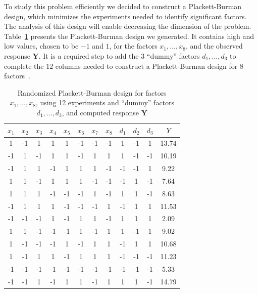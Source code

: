 \documentclass[conference]{IEEEtran}
\begin{document}
To  study this  problem efficiently  we decided  to construct  a Plackett-Burman
design, which minimizes the experiments  needed to identify significant factors.
The analysis of this design will enable decreasing the dimension of the problem.
Table~\ref{tab:plackett} presents  the Plackett-Burman design we  generated.  It
contains  high and  low values,  chosen  to be  \(-1\)  and \(1\),  for the  factors
\(x_1,\dots,x_8\), and the observed response \(\mathbf{Y}\).  It is a required step to
add the 3  ``dummy'' factors \(d_1,\dots,d_3\) to complete the  12 columns needed to
construct a Plackett-Burman design for 8 factors~\cite{plackett1946design}.

\begin{table}[b]
\centering
\caption{Randomized Plackett-Burman design for factors $x_1, \dots, x_8$, using 12 experiments and ``dummy'' factors $d_1, \dots, d_3$, and computed response $\mathbf{Y}$}
\label{tab:plackett}
\begingroup\scriptsize
\begin{tabular}{cccccccccccc}
  \toprule
$x_1$ & $x_2$ & $x_3$ & $x_4$ & $x_5$ & $x_6$ & $x_7$ & $x_8$ & $d_1$ & $d_2$ & $d_3$ & $Y$ \\
  \midrule
1 & -1 & 1 & 1 & 1 & -1 & -1 & -1 & 1 & -1 & 1 & 13.74 \\
  -1 & 1 & -1 & 1 & 1 & -1 & 1 & 1 & 1 & -1 & -1 & 10.19 \\
  -1 & 1 & 1 & -1 & 1 & 1 & 1 & -1 & -1 & -1 & 1 & 9.22 \\
  1 & 1 & -1 & 1 & 1 & 1 & -1 & -1 & -1 & 1 & -1 & 7.64 \\
  1 & 1 & 1 & -1 & -1 & -1 & 1 & -1 & 1 & 1 & -1 & 8.63 \\
  -1 & 1 & 1 & 1 & -1 & -1 & -1 & 1 & -1 & 1 & 1 & 11.53 \\
  -1 & -1 & -1 & 1 & -1 & 1 & 1 & -1 & 1 & 1 & 1 & 2.09 \\
  1 & 1 & -1 & -1 & -1 & 1 & -1 & 1 & 1 & -1 & 1 & 9.02 \\
  1 & -1 & -1 & -1 & 1 & -1 & 1 & 1 & -1 & 1 & 1 & 10.68 \\
  1 & -1 & 1 & 1 & -1 & 1 & 1 & 1 & -1 & -1 & -1 & 11.23 \\
  -1 & -1 & -1 & -1 & -1 & -1 & -1 & -1 & -1 & -1 & -1 & 5.33 \\
  -1 & -1 & 1 & -1 & 1 & 1 & -1 & 1 & 1 & 1 & -1 & 14.79 \\
   \bottomrule
\end{tabular}
\endgroup
\end{table}
\end{document}
